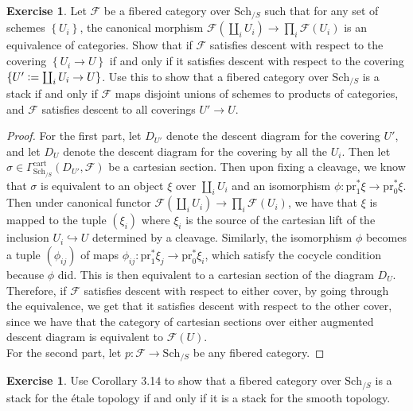 \documentclass[psamsfonts, 12pt]{amsart}
\theoremstyle{definition}
\newtheorem{exer}[thm]{Exercise}
\theoremstyle{remark}
\newcommand{\set}[1]{\left\lbrace #1 \right\rbrace}
\newcommand{\defeq}{\vcentcolon=}
\begin{document}
%
\setcounter{thm}{12}
%
\begin{exer}
Let $\mathcal{F}$ be a fibered category over $\mathrm{Sch}_{/S}$ such that for
any set of schemes $\set{U_i}$, the canonical morphism
$\mathcal{F}(\coprod_iU_i) \to \prod_i \mathcal{F}(U_i)$ is an equivalence of
categories. Show that if $\mathcal{F}$ satisfies descent with respect to the
covering $\set{U_i \to U}$ if and only if it satisfies descent with respect to
the covering $\set{U' \defeq \coprod_i U_i \to U}$. Use this to show that a fibered
category over $\mathrm{Sch}_{/S}$ is a stack if and only if $\mathcal{F}$ maps disjoint
unions of schemes to products of categories, and $\mathcal{F}$ satisfies descent
to all coverings $U' \to U$.
\end{exer}
%
\begin{proof}
For the first part, let $D_{U'}$ denote the descent diagram for the
covering $U'$, and let $D_U$ denote the descent diagram for the covering by
all the $U_i$. Then let
$\sigma \in \Gamma^{\mathrm{cart}}_{\mathrm{Sch}_{/S}}(D_{U'},\mathcal{F})$
be a cartesian section. Then upon fixing a cleavage, we know that $\sigma$ is equivalent
to an object $\xi$ over $\coprod_i U_i$ and an isomorphism
$\phi : \mathrm{pr}_1^*\xi \to \mathrm{pr}_0^*\xi$. Then under canonical functor
$\mathcal{F}(\coprod_i U_i) \to \prod_i \mathcal{F}(U_i)$, we have that
$\xi$ is mapped to the tuple $(\xi_i)$ where $\xi_i$ is the source of the cartesian
lift of the inclusion $U_i \hookrightarrow U$ determined by a cleavage. Similarly,
the isomorphism $\phi$ becomes a tuple $(\phi_{ij})$ of maps
$\phi_{ij} : \mathrm{pr}_1^*\xi_j \to \mathrm{pr}_0^*\xi_i$, which satisfy the
cocycle condition because $\phi$ did. This is then equivalent to a cartesian
section of the diagram $D_U$. Therefore, if $\mathcal{F}$ satisfies descent
with respect to either cover, by going through the equivalence, we get that it
satisfies descent with respect to the other cover, since we have that the
category of cartesian sections over either augmented descent diagram is
equivalent to $\mathcal{F}(U)$. \\

For the second part, let $p : \mathcal{F} \to \mathrm{Sch}_{/S}$ be any fibered
category.
\end{proof}
%
\begin{exer}
Use Corollary 3.14 to show that a fibered category over $\mathrm{Sch}_{/S}$ is a
stack for the \'etale topology if and only if it is a stack for the smooth topology.
\end{exer}
%
\end{document}
